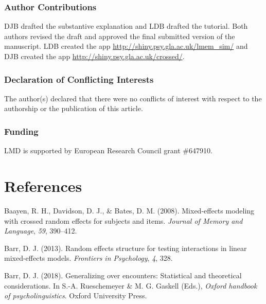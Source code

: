 \documentclass[
  english,
  doc,floatsintext]{apa6}
\begin{document}
\hypertarget{author-contributions}{%
\subsubsection{Author Contributions}\label{author-contributions}}

DJB drafted the substantive explanation and LDB drafted the tutorial. Both authors revised the draft and approved the final submitted version of the manuscript. LDB created the app \url{http://shiny.psy.gla.ac.uk/lmem_sim/} and DJB created the app \url{http://shiny.psy.gla.ac.uk/crossed/}.

\hypertarget{declaration-of-conflicting-interests}{%
\subsubsection{Declaration of Conflicting Interests}\label{declaration-of-conflicting-interests}}

The author(s) declared that there were no conflicts of interest with respect to the authorship or the publication of this article.

\hypertarget{funding}{%
\subsubsection{Funding}\label{funding}}

LMD is supported by European Research Council grant \#647910.

\newpage

\hypertarget{references}{%
\section{References}\label{references}}

\begingroup
\setlength{\parindent}{-0.5in}
\setlength{\leftskip}{0.5in}

\hypertarget{refs}{}
\leavevmode\hypertarget{ref-baayen_davidson_bates_2008}{}%
Baayen, R. H., Davidson, D. J., \& Bates, D. M. (2008). Mixed-effects modeling with crossed random effects for subjects and items. \emph{Journal of Memory and Language}, \emph{59}, 390--412.

\leavevmode\hypertarget{ref-barr_2013}{}%
Barr, D. J. (2013). Random effects structure for testing interactions in linear mixed-effects models. \emph{Frontiers in Psychology}, \emph{4}, 328.

\leavevmode\hypertarget{ref-barr_2018}{}%
Barr, D. J. (2018). Generalizing over encounters: Statistical and theoretical considerations. In S.-A. Rueschemeyer \& M. G. Gaskell (Eds.), \emph{Oxford handbook of psycholinguistics}. Oxford University Press.
\end{document}
